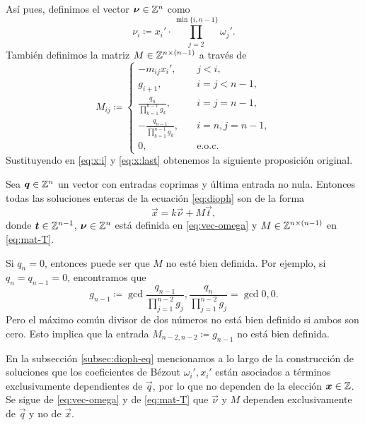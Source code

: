 Así pues, definimos el vector $\boldsymbol{\nu} \in \mathbb{Z}^n$ como
\begin{equation}
	\label{eq:vec-omega}
	\nu_i \coloneq x_i' \cdot \prod_{j = 2}^{\min{\lbrace i, n - 1 \rbrace}}\omega_j'.
\end{equation}
También definimos la matriz $M \in \mathbb{Z}^{n \times (n - 1)}$ a través de
\begin{equation}
	\label{eq:mat-T}
	M_{ij} \coloneq \begin{cases}
		-m_{ij}x_i', &\quad j < i, \\
		g_{i + 1},  &\quad i = j < n - 1, \\
		\frac{q_n}{\prod_{k=1}^{n-1}g_k}, &\quad i = j = n - 1, \\
		-\frac{q_{n-1}}{\prod_{k=1}^{n-1}g_k}, &\quad i = n, j = n - 1, \\
		0, &\quad \text{e.o.c.}
	\end{cases}
\end{equation}
Sustituyendo en \eqref{eq:x:i} y \eqref{eq:x:last} obtenemos la siguiente proposición original.
\begin{prop}
	\label{prop:xint}
	Sea $\boldsymbol{q} \in \mathbb{Z}^n$ un vector con entradas coprimas y última entrada no nula. Entonces todas
	las soluciones enteras de la ecuación \eqref{eq:dioph} son de la forma
	\begin{equation}
		\label{eq:transf}
		\vec{x} = k\vec{\nu} + M\vec{t},
	\end{equation}
	donde $\boldsymbol{t} \in \mathbb{Z}^{n-1}$, $\boldsymbol{\nu} \in \mathbb{Z}^n$ está definida en \eqref{eq:vec-omega} y $M
	\in \mathbb{Z}^{n \times (n - 1)}$ en \eqref{eq:mat-T}.
\end{prop}

\begin{observation}
	Si $q_n = 0$, entonces puede ser que $M$ no esté bien definida. Por ejemplo, si
	$q_n = q_{n-1} = 0$, encontramos que
	\begin{equation*}
		g_{n-1} \coloneq \gcd{\frac{q_{n-1}}{\prod_{j=1}^{n-2}g_j},
		\frac{q_n}{\prod_{j=1}^{n-2}g_j}} = \gcd{0, 0}.
	\end{equation*}
	Pero el máximo común divisor de dos números no está bien definido si ambos
	son cero. Esto implica que la entrada $M_{n-2, n-2} \coloneq g_{n-1}$ no
	está bien definida.
\end{observation}

En la subsección \ref{subsec:dioph-eq} mencionamos a lo largo de la construcción de soluciones que
los coeficientes de Bézout $\omega_i', x_i'$ están asociados a términos exclusivamente dependientes
de $\vec{q}$, por lo que no dependen de la elección $\boldsymbol{x} \in \mathbb{Z}$. Se sigue de
\eqref{eq:vec-omega} y de \eqref{eq:mat-T} que $\vec{\nu}$ y $M$ dependen exclusivamente de
$\vec{q}$ y no de $\vec{x}$.

